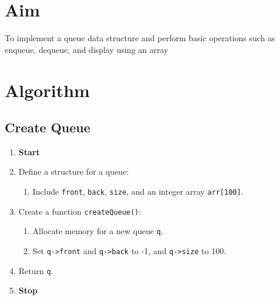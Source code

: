 
\section{Aim}
To implement a queue data structure and perform basic operations such as enqueue, dequeue, and display using an array

\section{Algorithm}
 {\selectfont
  \subsection{Create Queue}
  \begin{enumerate}[label=\arabic*:,left=0pt]
    \item \textbf{Start}

    \item Define a structure for a queue:
          \begin{enumerate}[label=2.\arabic*.]
            \item Include \texttt{front}, \texttt{back}, \texttt{size}, and an integer array \texttt{arr[100]}.
          \end{enumerate}

    \item Create a function \texttt{createQueue()}:
          \begin{enumerate}[label=3.\arabic*.]
            \item Allocate memory for a new queue \texttt{q}.
            \item Set \texttt{q->front} and \texttt{q->back} to -1, and \texttt{q->size} to 100.
          \end{enumerate}
    \item Return \texttt{q}.
    \item \textbf{Stop}
  \end{enumerate}

}
